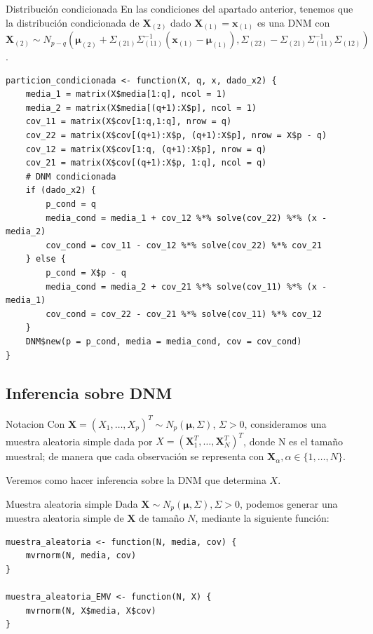 \documentclass[xcolor=table]{beamer}
\begin{document}
\begin{frame}{Distribución condicionada}
En las condiciones del apartado anterior, tenemos que la distribución condicionada de $\pmb{X}_{(2)}$ dado $\pmb{X}_{(1)} = \pmb{x}_{(1)}$ es una DNM con $\pmb{X}_{(2)} \sim N_{p-q}(\pmb{\mu}_{(2)}+\Sigma_{(21)} \Sigma_{(11)}^{-1}(\pmb{x}_{(1)} - \pmb{\mu}_{(1)}), \Sigma_{(22)} - \Sigma_{(21)} \Sigma_{(11)}^{-1}\Sigma_{(12)})$.

\end{frame}

\begin{frame}[fragile]
\scriptsize
\begin{lstlisting}
particion_condicionada <- function(X, q, x, dado_x2) {
    media_1 = matrix(X$media[1:q], ncol = 1)
    media_2 = matrix(X$media[(q+1):X$p], ncol = 1)
    cov_11 = matrix(X$cov[1:q,1:q], nrow = q)
    cov_22 = matrix(X$cov[(q+1):X$p, (q+1):X$p], nrow = X$p - q)
    cov_12 = matrix(X$cov[1:q, (q+1):X$p], nrow = q)
    cov_21 = matrix(X$cov[(q+1):X$p, 1:q], ncol = q)
    # DNM condicionada
    if (dado_x2) {
        p_cond = q
        media_cond = media_1 + cov_12 %*% solve(cov_22) %*% (x - media_2)
        cov_cond = cov_11 - cov_12 %*% solve(cov_22) %*% cov_21
    } else {
        p_cond = X$p - q
        media_cond = media_2 + cov_21 %*% solve(cov_11) %*% (x - media_1)
        cov_cond = cov_22 - cov_21 %*% solve(cov_11) %*% cov_12
    }
    DNM$new(p = p_cond, media = media_cond, cov = cov_cond)
}
\end{lstlisting}
\end{frame}

\subsection{Inferencia sobre DNM}

\begin{frame}[fragile]{Notacion}
Con $\pmb{X} = (X_1, \ldots, X_p)^T \sim N_p(\pmb{\mu}, \Sigma)$, $\Sigma > 0$, consideramos una muestra aleatoria simple dada por $X = (\pmb{X}_1^T, \ldots, \pmb{X}_N^T)^T$, donde N es el tamaño muestral; de manera que cada observación se representa con $\pmb{X}_\alpha, \alpha \in \{1, \ldots, N\}$.

Veremos como hacer inferencia sobre la DNM que determina $X$.
\end{frame}


\begin{frame}[fragile]{Muestra aleatoria simple}
Dada $\pmb{X} \sim N_p(\pmb{\mu}, \Sigma), \Sigma > 0$, podemos generar una muestra aleatoria simple de $\pmb{X}$ de tamaño $N$, mediante la siguiente función:

\begin{lstlisting}
muestra_aleatoria <- function(N, media, cov) {
    mvrnorm(N, media, cov)
}

muestra_aleatoria_EMV <- function(N, X) {
    mvrnorm(N, X$media, X$cov)
}
\end{lstlisting}

\end{frame}
\end{document}
